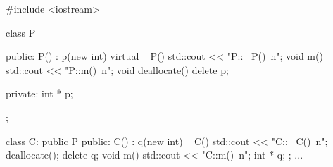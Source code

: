 \begin{console}
#include <iostream>

class P
{
public:
     P() : p(new int) {}
     virtual ~ P() { std::cout << "P::~ P()\ n"; }
     void m() { std::cout << "P::m()\ n"; }
     void deallocate() { delete p; }
     
private:
     int * p;
};

class C: public P
{
public:
     C() : q(new int) {}
     ~ C()
     {
         std::cout << "C::~ C()\ n";
         deallocate();
         delete q;
     }   
     void m() { std::cout << "C::m()\ n"; }
     int * q;
};
... 
\end{console}

